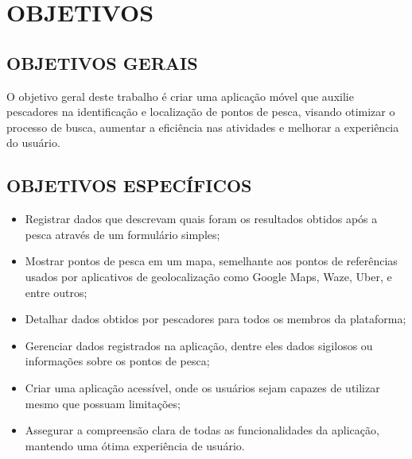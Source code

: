 
\chapter{OBJETIVOS}
\label{chap:objetivos}

\section{OBJETIVOS GERAIS}
\label{sec:objetivosGerais}

O objetivo geral deste trabalho é criar uma aplicação móvel que auxilie pescadores na identificação e localização de pontos de pesca, visando otimizar o processo de busca, aumentar a eficiência nas atividades e melhorar a experiência do usuário.

\section{OBJETIVOS ESPECÍFICOS}
\label{sec:objetivosEspecificos}

\begin{itemize}
  \item Registrar dados que descrevam quais foram os resultados obtidos após a pesca através de um formulário simples;
  \item Mostrar pontos de pesca em um mapa, semelhante aos pontos de referências usados por aplicativos de geolocalização como Google Maps, Waze, Uber, e entre outros;
  \item Detalhar dados obtidos por pescadores para todos os membros da plataforma;
  \item Gerenciar dados registrados na aplicação, dentre eles dados sigilosos ou informações sobre os pontos de pesca;
  \item Criar uma aplicação acessível, onde os usuários sejam capazes de utilizar mesmo que possuam limitações;
  \item Assegurar a compreensão clara de todas as funcionalidades da aplicação, mantendo uma ótima experiência de usuário. 
\end{itemize}